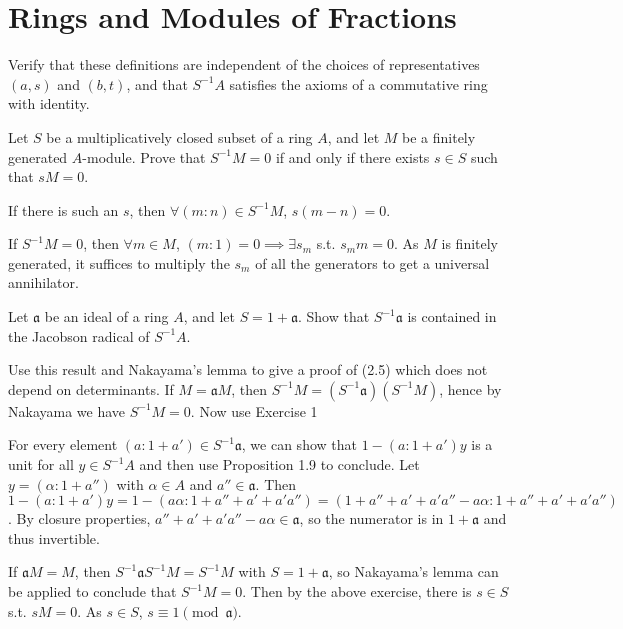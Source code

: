 \section{Rings and Modules of Fractions}

\begin{questions}
\question Verify that these definitions are independent of the choices of representatives $(a,s) $ and $(b,t) $, and that $S^{-1}A $ satisfies the axioms of a commutative ring with identity.
\end{questions}

\begin{questions}
\question Let $S$ be a multiplicatively closed subset of a ring $A $, and let $M$ be a finitely generated $A$-module. Prove that $S^{-1} M = 0$ if and only if there exists $s \in S$ such that $sM = 0$.
\begin{solution}
	If there is such an $s $, then $\forall (m:n) \in S^{-1}M $, $s(m-n) = 0$.

	If $S^{-1}M = 0 $, then $\forall m \in M $, $(m:1) = 0 \implies \exists s_m$ s.t. $s_m m = 0$.
	As $M$ is finitely generated, it suffices to multiply the $s_m$ of all the generators to get a universal annihilator.
\end{solution}

\question Let $\mathfrak{a}$ be an ideal of a ring $A $, and let $S = 1 + \mathfrak{a}$. Show that $S^{-1}\mathfrak{a}$ is contained in the Jacobson radical of $S^{-1}A$.

Use this result and Nakayama's lemma to give a proof of (2.5) which does not depend on determinants.
\ifhint
	If $M = \mathfrak{a}M $, then $S^{-1}M = (S^{-1}\mathfrak{a})(S^{-1}M) $, hence by Nakayama we have $S^{-1}M = 0 $. Now use Exercise 1
\fi
\begin{solution}
	For every element $(a:1+a') \in S^{-1}\mathfrak{a} $, we can show that $1 - (a:1+a')y $ is a unit for all $y\in S^{-1}A $ and then use Proposition 1.9 to conclude.
	Let $y = (\alpha :1+a'') $ with $\alpha  \in A $ and $a'' \in \mathfrak{a} $.
	Then $1 - (a:1+a')y = 1 - (a\alpha :1+a''+a'+a'a'') = (1+a''+a'+a'a'' - a\alpha :1+a''+a'+a'a'') $.
	By closure properties, $a''+a'+a'a''-a\alpha  \in \mathfrak{a} $, so the numerator is in $1+\mathfrak{a} $ and thus invertible.

	If $\mathfrak{a}M = M $, then $S^{-1}\mathfrak{a}S^{-1}M = S^{-1}M $ with $S = 1 + \mathfrak{a} $, so Nakayama's lemma can be applied to conclude that $S^{-1}M = 0 $.
	Then by the above exercise, there is $s \in S $ s.t. $sM = 0 $.
	As $s \in S $, $s \equiv 1\pmod {\mathfrak{a}} $.
\end{solution}


\end{questions}

